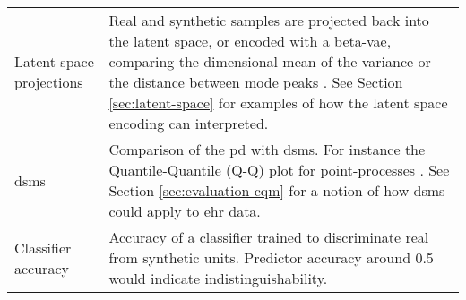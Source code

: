 \begin{table}[H]
\begin{tabular}{@{} p{} p{} @{}}
    Latent space projections 
    & Real and synthetic samples are projected back into the latent space, or encoded with a \gls{beta-vae}, comparing the dimensional mean of the variance or the distance between mode peaks \cite{Zhang2020}. See Section \ref{sec:latent-space} for examples of how the latent space encoding can interpreted. \\
    
    \glspl{dsm} 
    & Comparison of the \gls{pd} with \glspl{dsm}. For instance the Quantile-Quantile (Q-Q) plot for point-processes \cite{Xiao2017-lh}. See Section \ref{sec:evaluation-cqm} for a notion of how \glspl{dsm} could apply to \gls{ehr} data.\\                              
    Classifier accuracy &  
    Accuracy of a classifier trained to discriminate real from synthetic units. Predictor accuracy around 0.5 would indicate indistinguishability. \cite{Fisher2019,walsh2020generating}\\       
    
    \bottomrule                      
    \end{tabular}         
\end{table}
